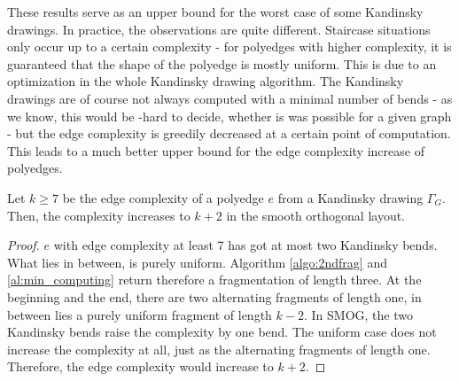 These results serve as an upper bound for the worst case of some Kandinsky drawings. In practice, the observations are quite different. Staircase situations only occur up to a certain complexity - for polyedges with higher complexity, it is guaranteed that the shape of the polyedge is mostly uniform. This is due to an optimization in the whole Kandinsky drawing algorithm. The Kandinsky drawings are of course not always computed with a minimal number of bends - as we know, this would be \NP-hard to decide, whether is was possible for a given graph - but the edge complexity is greedily decreased at a certain point of computation. This leads to a much better upper bound for the edge complexity increase of polyedges.
\begin{lemma}
	Let $k \geq 7$ be the edge complexity of a polyedge $e$ from a Kandinsky drawing $\Gamma_G$. Then, the complexity increases to $k+2$ in the smooth orthogonal layout. 
\end{lemma}
\begin{proof}
	$e$ with edge complexity at least 7 has got at most two Kandinsky bends. What lies in between, is purely uniform. Algorithm \ref{algo:2ndfrag} and \ref{al:min_computing} return therefore a fragmentation of length three. At the beginning and the end, there are two alternating fragments of length one, in between lies a purely uniform fragment of length $k-2$. In SMOG, the two Kandinsky bends raise the complexity by one bend. The uniform case does not increase the complexity at all, just as the alternating fragments of length one. Therefore, the edge complexity would increase to $k+2$. 
\end{proof}